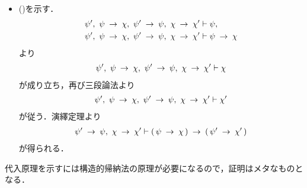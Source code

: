 \begin{sketch}
\begin{itemize}
			\item ()を示す．
				\begin{align}
					\psi',\ \psi \rarrow \chi,\ \psi' \rarrow \psi,\ \chi \rarrow \chi' &\vdash \psi, \\
					\psi',\ \psi \rarrow \chi,\ \psi' \rarrow \psi,\ \chi \rarrow \chi' &\vdash \psi \rarrow \chi
				\end{align}
				より
				\begin{align}
					\psi',\ \psi \rarrow \chi,\ \psi' \rarrow \psi,\ \chi \rarrow \chi' \vdash \chi
				\end{align}
				が成り立ち，再び三段論法より
				\begin{align}
					\psi',\ \psi \rarrow \chi,\ \psi' \rarrow \psi,\ \chi \rarrow \chi' \vdash \chi'
				\end{align}
				が従う．演繹定理より
				\begin{align}
					\psi' \hspace{0.25em}\rightarrow\hspace{0.25em} \psi,\ \chi \hspace{0.25em}\rightarrow\hspace{0.25em} \chi' \vdash
					(\, \psi \hspace{0.25em}\rightarrow\hspace{0.25em} \chi\, ) \hspace{0.25em}\rightarrow\hspace{0.25em} (\, \psi' \hspace{0.25em}\rightarrow\hspace{0.25em} \chi'\, )
				\end{align}
				が得られる．
				\QED
		\end{itemize}
	\end{sketch}
	
	代入原理を示すには構造的帰納法の原理が必要になるので，証明はメタなものとなる．
	
	\begin{comment}
	
	この原理の証明は相等性公理に負うところが多いが，
	本稿では$\varepsilon$項という厄介なものを抱え込んでいるため
	$\EQAX$だけでは不十分であり，次に追加する公理が必要になる．
	
	\begin{screen}
		\begin{axm}[$\varepsilon$項に対する相等性公理]
			$a,b$を類とし，$\varphi$を$\lang{\varepsilon}$の式とし，$\varphi$には変項$x,y$が
			自由に現れ，また$\varphi$に自由に現れる変項はこれらのみであるとする．このとき
			\begin{align}
				\EQAXEP \defarrow
				a = b \rarrow \varepsilon x \varphi(x,a) = \varepsilon x \varphi(x,b).
			\end{align}
		\end{axm}
	\end{screen}
	
	\end{comment}
	
